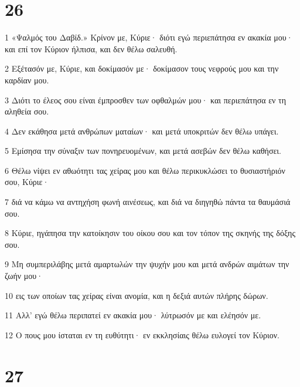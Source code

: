\chapter{26}

\par 1 «Ψαλμός του Δαβίδ.» Κρίνον με, Κύριε· διότι εγώ περιεπάτησα εν ακακία μου· και επί τον Κύριον ήλπισα, και δεν θέλω σαλευθή.
\par 2 Εξέτασόν με, Κύριε, και δοκίμασόν με· δοκίμασον τους νεφρούς μου και την καρδίαν μου.
\par 3 Διότι το έλεος σου είναι έμπροσθεν των οφθαλμών μου· και περιεπάτησα εν τη αληθεία σου.
\par 4 Δεν εκάθησα μετά ανθρώπων ματαίων· και μετά υποκριτών δεν θέλω υπάγει.
\par 5 Εμίσησα την σύναξιν των πονηρευομένων, και μετά ασεβών δεν θέλω καθήσει.
\par 6 Θέλω νίψει εν αθωότητι τας χείρας μου και θέλω περικυκλώσει το θυσιαστήριόν σου, Κύριε·
\par 7 διά να κάμω να αντηχήση φωνή αινέσεως, και διά να διηγηθώ πάντα τα θαυμάσιά σου.
\par 8 Κύριε, ηγάπησα την κατοίκησιν του οίκου σου και τον τόπον της σκηνής της δόξης σου.
\par 9 Μη συμπεριλάβης μετά αμαρτωλών την ψυχήν μου και μετά ανδρών αιμάτων την ζωήν μου·
\par 10 εις των οποίων τας χείρας είναι ανομία, και η δεξιά αυτών πλήρης δώρων.
\par 11 Αλλ' εγώ θέλω περιπατεί εν ακακία μου· λύτρωσόν με και ελέησόν με.
\par 12 Ο πους μου ίσταται εν τη ευθύτητι· εν εκκλησίαις θέλω ευλογεί τον Κύριον.

\chapter{27}

